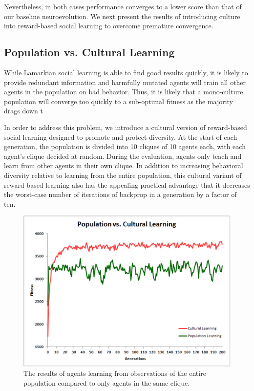 \documentclass{acm_proc_article-sp}
\begin{document}
Nevertheless, in both cases performance converges to a lower score than that of our baseline neuroevolution. We next present the results of introducing culture into reward-based social learning to overcome premature convergence.

\subsection*{Population vs. Cultural Learning}
While Lamarkian social learning is able to find good results quickly, it is likely to provide redundant information and harmfully mutated agents will train all other agents in the population on bad behavior. Thus, it is likely that a mono-culture population will converge too quickly to a sub-optimal fitness as the majority drags down t

In order to address this problem, we introduce a cultural version of reward-based social learning designed to promote and protect diversity. At the start of each generation, the population is divided into 10 cliques of 10 agents each, with each agent's clique decided at random. During the evaluation, agents only teach and learn from other agents in their own clique. In addition to increasing behavioral diversity relative to learning from the entire population, this cultural variant of reward-based learning also has the appealing practical advantage that it decreases the worst-case number of iterations of backprop in a generation by a factor of ten.

\begin{figure}
  \centering
    \includegraphics[scale=.35]{population_vs_cultural_learning.pdf}
  \caption{The results of agents learning from observations of the entire population compared to only agents in the same clique.}
  \label{fig:population-social}
\end{figure}
\end{document}
